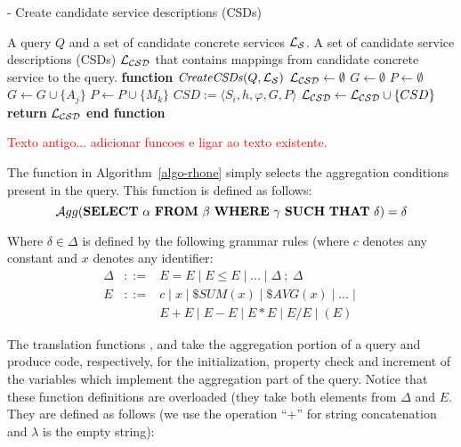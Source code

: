 \begin{algorithm}
\caption{ - Create candidate service descriptions (CSDs)}
\label{creatingcsds}
\begin{algorithmic}[1]
\REQUIRE A query $Q$ and a set of candidate concrete services $\hbox{${\cal L_{S}}$}$.
\ENSURE A set of candidate service descriptions (CSDs) $\hbox{${\cal L_{CSD}}$}$ that contains mappings from candidate concrete service to the query.
\STATE \textbf{function} $\mathit{CreateCSDs} (Q, \hbox{${\cal L_{S}}$})$
\STATE $\hbox{${\cal L_{CSD}}$} \leftarrow \emptyset$
		\STATE $G \leftarrow \emptyset$	
		\STATE $P \leftarrow \emptyset$		
			\STATE $G \leftarrow G \cup \lbrace A_{j} \rbrace$ 
		\ENDFOR
			\STATE $P \leftarrow P \cup \lbrace M_{k} \rbrace$ 
		\ENDFOR
		\STATE $CSD := \langle S_{i}, h, \varphi, G, P \rangle$	
		\STATE $\hbox{${\cal L_{CSD}}$} \leftarrow \hbox{${\cal L_{CSD}}$} \cup \lbrace CSD \rbrace$	
	\ENDIF
\ENDFOR
\STATE \textbf{return} $\hbox{${\cal L_{CSD}}$}$
\STATE \textbf{end function}
\end{algorithmic}
\end{algorithm}


\textcolor{red}{Texto antigo... adicionar funcoes e ligar ao texto existente.} 
 
 The function \agg{\_} in Algorithm~\ref{algo-rhone} simply selects the aggregation conditions present in the query. 
This function is defined as follows:
\[
\agg{\mathbf{SELECT}\ \alpha\ \mathbf{FROM}\ \beta\ \mathbf{WHERE}\ \gamma\ \mathbf{SUCH\ THAT}\ \delta} = \delta 
\]

Where $\delta \in \Delta$ is defined by the following grammar rules (where $c$ denotes any constant and $x$ denotes any identifier:
\begin{eqnarray*}
\Delta & ::= & E = E \mid E \leq E \mid \dots \mid \Delta\ ;\ \Delta   \\
E      & ::= & c \mid x \mid \$\mathit{SUM(x)} \mid \$\mathit{AVG(x)} \mid \dots \mid \\
       &     & E + E \mid E - E \mid E * E \mid E / E \mid ( E )
\end{eqnarray*}

The translation functions \tqI{\_}, \tqT{\_} and \tqS{\_} take the aggregation portion of a query and produce code, respectively, for the initialization, property check and increment of the variables which implement the aggregation part of the query.
Notice that these function definitions are overloaded (they take both elements from $\Delta$ and $E$.
They are defined as follows (we use the operation ``+'' for string concatenation and $\lambda$ is the empty string):

